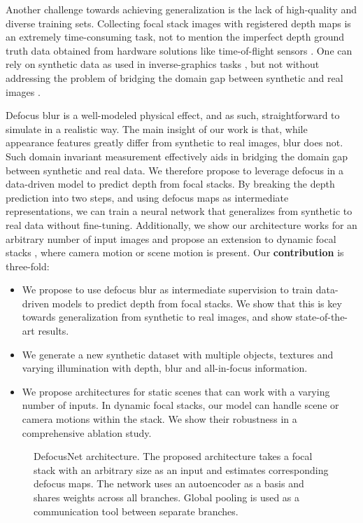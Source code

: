 \documentclass[10pt,twocolumn,letterpaper]{article}
\begin{document}
Another challenge towards achieving generalization is the lack of high-quality and diverse training sets.
Collecting focal stack images with registered depth maps is an extremely time-consuming task, not to mention the imperfect depth ground truth data obtained from hardware solutions like time-of-flight sensors \cite{Hazirbas18}. 
One can rely on synthetic data as used in inverse-graphics tasks \cite{Sundermeyer18,Li18, Material_Li18, Guo18}, 
but not without addressing the problem of bridging the domain gap between synthetic and real images \cite{Peng2018Syn2RealAN}.


Defocus blur is a well-modeled physical effect, and as such, straightforward to simulate in a realistic way.
The main insight of our work is that, while appearance features greatly differ from synthetic to real images, blur does not. Such domain invariant measurement effectively aids in bridging the domain gap between synthetic and real data.
We therefore propose to leverage defocus in a data-driven model to predict depth from focal stacks. By breaking the depth prediction into two steps, and using defocus maps as intermediate representations, we can train a neural network that generalizes from synthetic to real data without fine-tuning.
Additionally, we show our architecture works for an arbitrary number of input images and propose an extension to dynamic focal stacks \cite{VideoDFD_Kim16}, where camera motion or scene motion is present. 
Our {\bf contribution} is three-fold:
\begin{itemize}
    \item We propose to use defocus blur as intermediate supervision to train data-driven models to predict depth from focal stacks. We show that this is key towards generalization from synthetic to real images, and show state-of-the-art results.
    
    \item We generate a new synthetic dataset with multiple objects, textures and varying illumination with depth, blur and all-in-focus information.
    
    \item We propose architectures for static scenes that can work with a varying number of inputs. In dynamic focal stacks, our model can handle scene or camera motions within the stack. We show their robustness in a comprehensive ablation study.

\end{itemize}



\begin{figure}
\begin{center}
\end{center}
   \caption{DefocusNet architecture. The proposed architecture takes a focal stack with an arbitrary size as an input and estimates corresponding defocus maps. The network uses an autoencoder as a basis and shares weights across all branches. Global pooling is used as a communication tool between separate branches.
   }
\label{fig:pipeline}
\end{figure}
\end{document}
